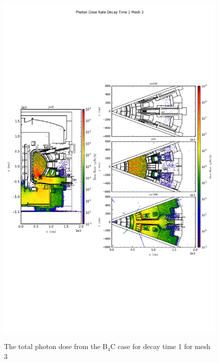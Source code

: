 \begin{figure}[ht!]
\centering
\includegraphics[trim={0cm 9cm 0cm 10cm},clip,scale=0.75]{../plots/final_model_with_b4c/Photon_Dose_Rate_Decay_Time_1_Mesh_3.png}
\label{fig:photons_dc1_no4bc_m3_flux}
\caption{The total photon dose from the B$_4$C case for decay time 1 for mesh 3}
\end{figure}

